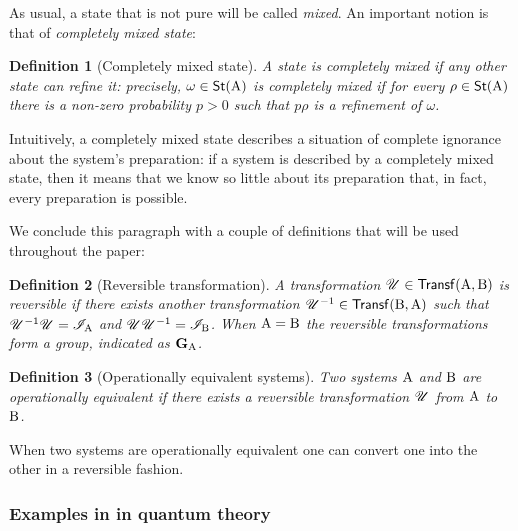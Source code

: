 \documentclass[12pt,aps,pra,showpacs,groupedaddress]{revtex4-1}
\newtheorem{definition}{Definition}
\def\Proof{\medskip\par\noindent{\bf Proof. }}
\def\qed{$\,\blacksquare$\par}
\def\rB{{\rm B}}
\def\Cntset{{\mathsf{Eff}}}
\def\Stset{{\mathsf{St}}}
\def\Trnset{{\mathsf{Transf}}}
\def\grp#1{{\mathbf{#1}}} \def\Span{\mathsf{Span}}
\def\SC#1#2{\left(#1\right|\left.\!#2\right)}  \def\Tr{{\rm Tr}}
\begin{document}
As usual, a state that is not pure will be called \emph{mixed}. An important notion is that of \emph{completely mixed state}:  
\begin{definition}[Completely mixed state]\label{def:complemix}
 A state is \emph{completely mixed} if any other state can refine it:
 precisely, $\omega\in\Stset(\rA)$ is completely mixed if for every $\rho \in\Stset(\rA)$ there is
 a non-zero probability $p>0$ such that $p \rho$ is a refinement of $\omega$.  
 \end{definition}
Intuitively, a completely mixed state describes a situation of complete ignorance about the system's preparation:   if a system is described by a completely mixed state, then it  means that we know so little about its preparation that, in fact, every preparation is possible.


We conclude this paragraph with a couple of definitions that will be used throughout the paper: 
\begin{definition}[Reversible transformation]
A transformation $\tU \in \Trnset (\rA, \rB)$ is \emph{reversible} if there exists another
transformation $\tU^{-1}\in\Trnset(\rB,\rA)$ such that $\mathscr U^{-1}\mathscr U = \mathscr I_{\rm A} $ and $\tU \tU^{-1} =
\tI_\rB$.  When $\rA=\rB$ the reversible transformations form a group, indicated as $\grp G_\rA$.
\end{definition}
\begin{definition}[Operationally equivalent systems]\label{def:opeq}
Two systems ${\rm A}$ and $\rB$ are \emph{operationally equivalent} if there exists a reversible
transformation $\mathscr U$ from ${\rm A}$ to $\rB$.  
\end{definition}
When two systems are operationally equivalent one can
convert one into the other in a reversible fashion.


   

\subsubsection{Examples in in quantum theory }  
\end{document}
